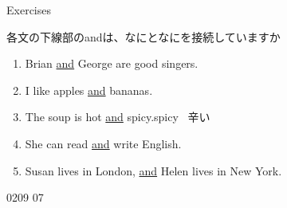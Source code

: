 \documentclass[aspectratio=169,xcolor={dvipsnames,table}]{beamer}
\begin{document}
\begin{frame}[plain]{Exercises}

 {\small 各文の下線部のandは、なにとなにを接続していますか}
\begin{enumerate}
 \item Brian \underline{and} George are good singers.
 \item I like apples \underline{and} bananas.
 \item The soup is hot \underline{and} spicy.\hfill{spicy {\small {}\, 辛い}}
 \item She can read \underline{and} write English.\\
\hfill{}
 \item Susan lives in London, \underline{and} Helen lives in New York.\\
\hfill{}
\end{enumerate}

\hfill{\tiny 0209}\,{\tiny{}\,07}
\end{frame}
\end{document}
